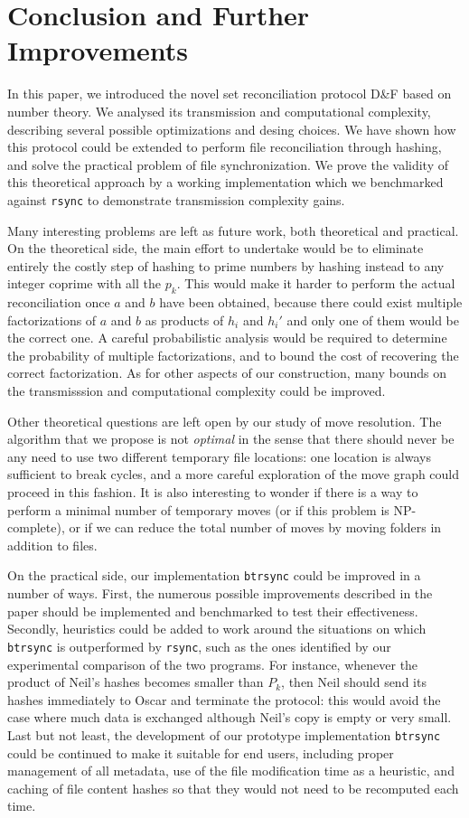 \documentclass[twoside,envcountsame,runningheads]{llncs}
\newcommand{\df}{D\&F\xspace}
\newcommand{\btrsync}{\texttt{btrsync}\xspace}
\newcommand{\rsync}{\texttt{rsync}\xspace}
\begin{document}
\section{Conclusion and Further Improvements}

In this paper, we introduced the novel set reconciliation protocol \df based on number theory. We analysed its transmission and computational complexity, describing several possible optimizations and desing choices. We have shown how this protocol could be extended to perform file reconciliation through hashing, and solve the practical problem of file synchronization. We prove the validity of this theoretical approach by a working implementation which we benchmarked against \rsync to demonstrate transmission complexity gains.

Many interesting problems are left as future work, both theoretical and practical. On the theoretical side, the main effort to undertake would be to eliminate entirely the costly step of hashing to prime numbers by hashing instead to any integer coprime with all the $p_k$. This would make it harder to perform the actual reconciliation once $a$ and $b$ have been obtained, because there could exist multiple factorizations of $a$ and $b$ as products of $h_i$ and $h_i'$ and only one of them would be the correct one. A careful probabilistic analysis would be required to determine the probability of multiple factorizations, and to bound the cost of recovering the correct factorization.
As for other aspects of our construction, many bounds on the transmisssion and computational complexity could be improved.

Other theoretical questions are left open by our study of move resolution. The algorithm that we propose is not \emph{optimal} in the sense that there should never be any need to use two different temporary file locations: one location is always sufficient to break cycles, and a more careful exploration of the move graph could proceed in this fashion. It is also interesting to wonder if there is a way to perform a minimal number of temporary moves (or if this problem is NP-complete), or if we can reduce the total number of moves by moving folders in addition to files.

On the practical side, our implementation \btrsync could be improved in a number of ways. First, the numerous possible improvements described in the paper should be implemented and benchmarked to test their effectiveness. Secondly, heuristics could be added to work around the situations on which \btrsync is outperformed by \rsync, such as the ones identified by our experimental comparison of the two programs. For instance, whenever the product of Neil's hashes becomes smaller than $P_k$, then Neil should send its hashes immediately to Oscar and terminate the protocol: this would avoid the case where much data is exchanged although Neil's copy is empty or very small. Last but not least, the development of our prototype implementation \btrsync could be continued to make it suitable for end users, including proper management of all metadata, use of the file modification time as a heuristic, and caching of file content hashes so that they would not need to be recomputed each time.
\end{document}
